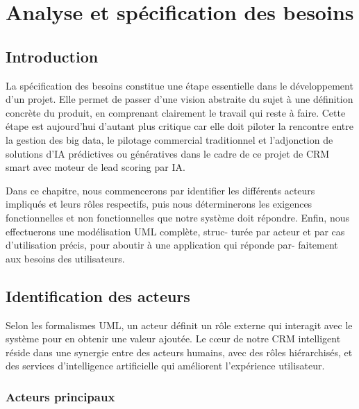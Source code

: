 \chapter{Analyse et spécification des besoins}
\label{chap:analyse_besoins}
\section*{Introduction}
La spécification des besoins constitue une étape essentielle dans le développement d’un projet.
Elle permet de passer d’une vision abstraite du sujet à une définition concrète du produit,
en comprenant clairement le travail qui reste à faire. Cette étape est aujourd’hui d’autant plus
critique car elle doit piloter la rencontre entre la gestion des big data, le pilotage commercial
traditionnel et l’adjonction de solutions d’IA prédictives ou génératives dans le cadre de ce
projet de CRM smart avec moteur de lead scoring par IA.

Dans ce chapitre, nous commencerons par identifier les différents acteurs impliqués et leurs
rôles respectifs, puis nous déterminerons les exigences fonctionnelles et non fonctionnelles que
notre système doit répondre. Enfin, nous effectuerons une modélisation UML complète, struc-
turée par acteur et par cas d’utilisation précis, pour aboutir à une application qui réponde par-
faitement aux besoins des utilisateurs.

\section{Identification des acteurs}

Selon les formalismes UML, un acteur définit un rôle externe qui interagit avec le système
pour en obtenir une valeur ajoutée. Le cœur de notre CRM intelligent réside dans une synergie
entre des acteurs humains, avec des rôles hiérarchisés, et des services d’intelligence artificielle
qui améliorent l’expérience utilisateur.

\subsection*{Acteurs principaux}

